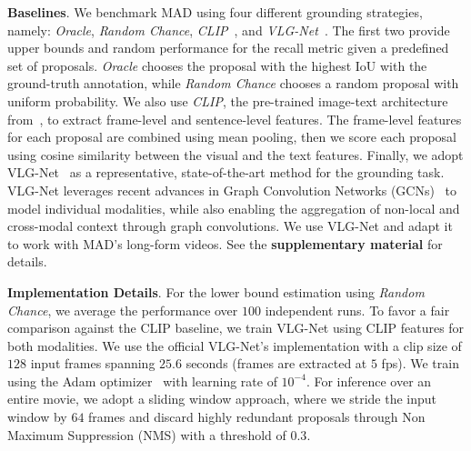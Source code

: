 \documentclass[10pt,twocolumn,letterpaper]{article}
\renewcommand{\paragraph}[1]{\vspace{1mm}\noindent\textbf{#1}.}
\begin{document}
\paragraph{Baselines}
We benchmark MAD using four different grounding strategies, namely: \textit{Oracle}, \textit{Random Chance}, \textit{CLIP}~\cite{radford2021learning}, and \textit{VLG-Net}~\cite{soldan2021vlg}. The first two provide upper bounds and random performance for the recall metric given a predefined set of proposals. \textit{Oracle} chooses the proposal with the highest IoU with the ground-truth annotation, while \textit{Random Chance} chooses a random proposal with uniform probability. We also use \textit{CLIP}, the pre-trained image-text architecture from~\cite{radford2021learning}, to extract frame-level and sentence-level features. The frame-level features for each proposal are combined using mean pooling, then we score each proposal using cosine similarity between the visual and the text features. Finally, we adopt VLG-Net~\cite{soldan2021vlg} as a representative, state-of-the-art method for the  grounding task. VLG-Net leverages recent advances in Graph Convolution Networks (GCNs)~\cite{li2019deepgcns,xu2020gtad,li2021deepgcns_pami,li2020deepergcn,zhao2021video} to model individual modalities, while also enabling the aggregation of non-local and cross-modal context through graph convolutions. We use VLG-Net and adapt it to work with MAD's long-form videos. See the \textbf{supplementary material} for details. 

\paragraph{Implementation Details}
For the lower bound estimation using \textit{Random Chance}, we average the performance over $100$ independent runs. 
To favor a fair comparison against the CLIP baseline, we train VLG-Net using CLIP features for both modalities. We use the official VLG-Net's implementation with a clip size of $128$ input frames spanning $25.6$ seconds (frames are extracted at $5$ fps). We train using the Adam optimizer~\cite{kingma2014adam} with learning rate of $10^{-4}$. For inference over an entire movie, we adopt a sliding window approach, where we stride the input window by $64$ frames and discard highly redundant proposals through Non Maximum Suppression (NMS) with a threshold of $0.3$.
\end{document}
